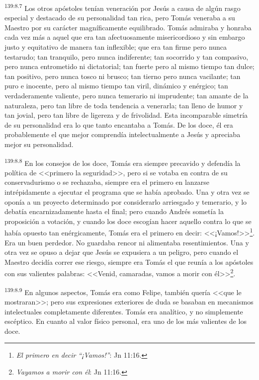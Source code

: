 \par 
\textsuperscript{139:8.7} Los otros apóstoles tenían veneración por Jesús a causa de algún rasgo especial y destacado de su personalidad tan rica, pero Tomás veneraba a su Maestro por su carácter magníficamente equilibrado. Tomás admiraba y honraba cada vez más a aquel que era tan afectuosamente misericordioso y sin embargo justo y equitativo de manera tan inflexible; que era tan firme pero nunca testarudo; tan tranquilo, pero nunca indiferente; tan socorrido y tan compasivo, pero nunca entrometido ni dictatorial; tan fuerte pero al mismo tiempo tan dulce; tan positivo, pero nunca tosco ni brusco; tan tierno pero nunca vacilante; tan puro e inocente, pero al mismo tiempo tan viril, dinámico y enérgico; tan verdaderamente valiente, pero nunca temerario ni imprudente; tan amante de la naturaleza, pero tan libre de toda tendencia a venerarla; tan lleno de humor y tan jovial, pero tan libre de ligereza y de frivolidad. Esta incomparable simetría de su personalidad era lo que tanto encantaba a Tomás. De los doce, él era probablemente el que mejor comprendía intelectualmente a Jesús y apreciaba mejor su personalidad.

\par 
\textsuperscript{139:8.8} En los consejos de los doce, Tomás era siempre precavido y defendía la política de <<primero la seguridad>>, pero si se votaba en contra de su conservadurismo o se rechazaba, siempre era el primero en lanzarse intrépidamente a ejecutar el programa que se había aprobado. Una y otra vez se oponía a un proyecto determinado por considerarlo arriesgado y temerario, y lo debatía encarnizadamente hasta el final; pero cuando Andrés sometía la proposición a votación, y cuando los doce escogían hacer aquello contra lo que se había opuesto tan enérgicamente, Tomás era el primero en decir: <<¡Vamos!>>\footnote{\textit{El primero en decir ``¡Vamos!''}: Jn 11:16.}. Era un buen perdedor. No guardaba rencor ni alimentaba resentimientos. Una y otra vez se opuso a dejar que Jesús se expusiera a un peligro, pero cuando el Maestro decidía correr ese riesgo, siempre era Tomás el que reunía a los apóstoles con sus valientes palabras: <<Venid, camaradas, vamos a morir con él>>\footnote{\textit{Vayamos a morir con él}: Jn 11:16.}.

\par 
\textsuperscript{139:8.9} En algunos aspectos, Tomás era como Felipe, también quería <<que le mostraran>>; pero sus expresiones exteriores de duda se basaban en mecanismos intelectuales completamente diferentes. Tomás era analítico, y no simplemente escéptico. En cuanto al valor físico personal, era uno de los más valientes de los doce.

